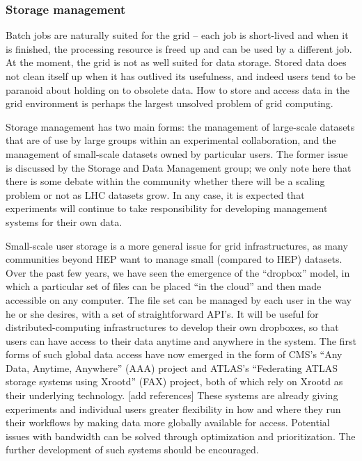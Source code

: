 \subsubsection{Storage management}

Batch jobs are naturally suited for the grid -- each job is short-lived and when it is finished, the processing resource is freed up and can be used by a different job.  At the moment, the grid is not as well suited for data storage.  Stored data does not clean itself up when it has outlived its usefulness, and indeed users tend to be paranoid about holding on to obsolete data.  How to store and access data in the grid environment is perhaps the largest unsolved problem of grid computing.

Storage management has two main forms: the management of large-scale datasets that are of use by large groups within an experimental collaboration, and the management of small-scale datasets owned by particular users.  The former issue is discussed by the Storage and Data Management group; we only note here that there is some debate within the community whether there will be a scaling problem or not as LHC datasets grow.  In any case, it is expected that experiments will continue to take responsibility for developing management systems for their own data.

Small-scale user storage is a more general issue for grid infrastructures, as many communities beyond HEP want to manage small (compared to HEP) datasets.  Over the past few years, we have seen the emergence of the ``dropbox'' model, in which a particular set of files can be placed ``in the cloud'' and then made accessible on any computer.  The file set can be managed by each user in the way he or she desires, with a set of straightforward API's.  It will be useful for distributed-computing infrastructures to develop their own dropboxes, so that users can have access to their data anytime and anywhere in the system.  The first forms of such global data access have now emerged in the form of CMS's ``Any Data, Anytime, Anywhere'' (AAA) project and ATLAS's ``Federating ATLAS storage systems using Xrootd'' (FAX) project, both of which rely on Xrootd as their underlying technology. [add references] These systems are already giving experiments and individual users greater flexibility in how and where they run their workflows by making data more globally available for access.  Potential issues with bandwidth can be solved through optimization and prioritization.  The further development of such systems should be encouraged.

